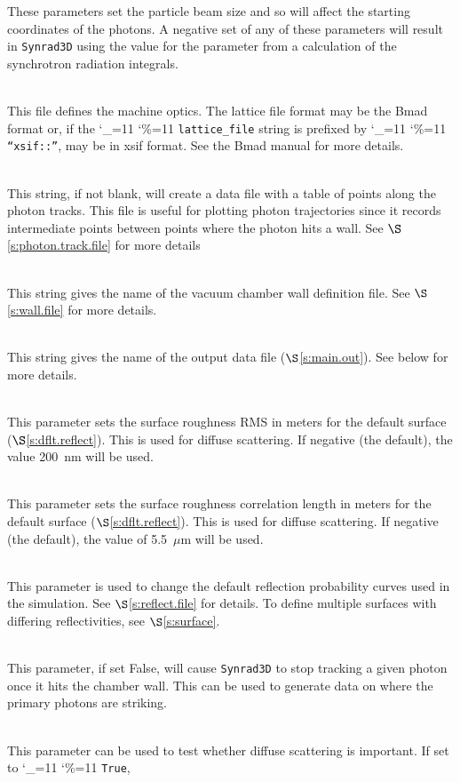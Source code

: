 \documentclass[11pt,openany]{report}
\newcommand{\sref}[1]{$\S$\ref{#1}}
\newcommand{\srthree}{\texttt{Synrad3D}\xspace}
\newcommand\ttcmd{\begingroup\catcode`\_=11 \catcode`\%=11 \dottcmd}
\newcommand\dottcmd[1]{\texttt{#1}\endgroup}
\newcommand{\vn}{\ttcmd}
\newcommand{\Newline}{\hfil \\}
\begin{document}
\begin{description}
These parameters set the particle beam size and so will affect the starting coordinates of
the photons. A negative set of any of these parameters will result in \srthree 
using the value for the parameter from a calculation of the synchrotron radiation integrals.
  \item[\vn{lattice_file}] \Newline
This file defines the machine optics. The lattice file format may be
the Bmad format or, if the \vn{lattice_file} string is prefixed by
\vn{``xsif::''}, may be in xsif format. See the Bmad manual for more details.
  \item[\vn{photon_track_file}] \Newline
This string, if not blank, will create a data file with a table of points along the photon tracks.
This file is useful for plotting photon trajectories since it records intermediate points between
points where the photon hits a wall.
See \sref{s:photon.track.file} for more details
  \item[\vn{wall_file}] \Newline
This string gives the name of the vacuum chamber wall definition
file. See \sref{s:wall.file} for more details.
  \item[\vn{dat_file}] \Newline
This string gives the name of the output data file (\sref{s:main.out}).
See below for more details.
  \item[\vn{surface_roughness_rms}] \Newline
This parameter sets the surface roughness RMS in meters for the
default surface (\sref{s:dflt.reflect}). This is used for diffuse
scattering.  If negative (the default), the value 200~nm will be used.
  \item[\vn{roughness_correlation_len}] \Newline
This parameter sets the surface roughness correlation length in meters
for the default surface (\sref{s:dflt.reflect}).  This is used for
diffuse scattering.  If negative (the default), the value of
5.5~$\mu$m will be used.
  \item[\vn{surface_reflection_file}] \Newline
This parameter is used to change the default reflection probability curves used in the
simulation. See \sref{s:reflect.file} for details. To define multiple surfaces with
differing reflectivities, see \sref{s:surface}.
  \item[\vn{sr3d_params\%allow_reflections}] \Newline
This parameter, if set False, will cause \srthree to stop tracking a given photon once
it hits the chamber wall. This can be used to generate data on where the primary photons are striking.
  \item[\vn{sr3d_params\%specular_reflection_only}] \Newline
This parameter can be used to test whether diffuse scattering is important. If set to \vn{True},

\end{description}
\end{document}
